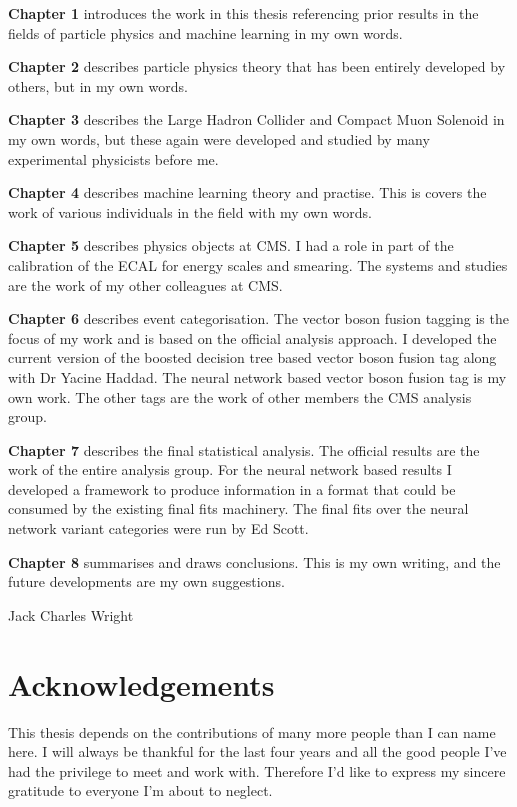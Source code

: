 \textbf{Chapter 1} introduces the work in this thesis referencing prior results in the fields of particle physics and machine learning in my own words.

\textbf{Chapter 2} describes particle physics theory that has been entirely developed by others, but in my own words.

\textbf{Chapter 3} describes the Large Hadron Collider and Compact Muon Solenoid in my own words, but these again were developed and studied by many experimental physicists before me.

\textbf{Chapter 4} describes machine learning theory and practise. This is covers the work of various individuals in the field with my own words.

\textbf{Chapter 5} describes physics objects at CMS. I had a role in part of the calibration of the ECAL for energy scales and smearing. The systems and studies are the work of my other colleagues at CMS.

\textbf{Chapter 6} describes event categorisation. The vector boson fusion tagging is the focus of my work and is based on the official analysis approach. I developed the current version of the boosted decision tree based vector boson fusion tag along with Dr Yacine Haddad. The neural network based vector boson fusion tag is my own work. The other tags are the work of other members the CMS \Hgg analysis group.

\textbf{Chapter 7} describes the final statistical analysis. The official results are the work of the entire \Hgg analysis group. For the neural network based results I developed a framework to produce information in a format that could be consumed by the existing final fits machinery. The final fits over the neural network variant categories were run by Ed Scott.  

\textbf{Chapter 8} summarises and draws conclusions. This is my own writing, and the future developments are my own suggestions.

\begin{flushright}
    Jack Charles Wright
\end{flushright}

\chapter*{\centering Acknowledgements}
This thesis depends on the contributions of many more people than I can name here. 
I will always be thankful for the last four years and all the good people I've had the privilege to meet and work with.
Therefore I'd like to express my sincere gratitude to everyone I'm about to neglect. 

